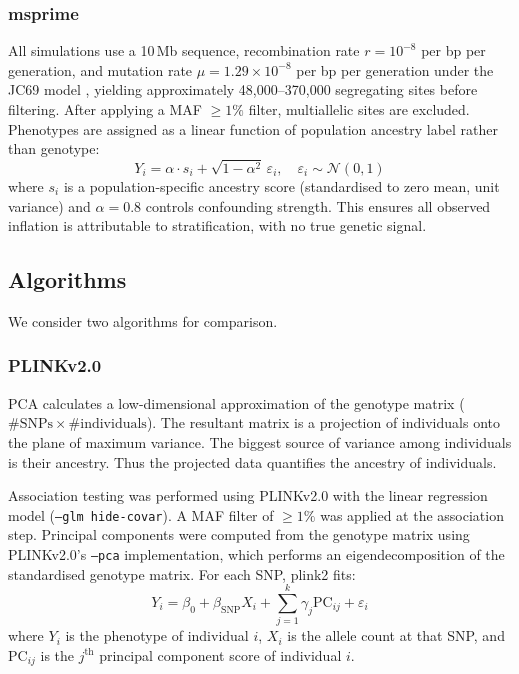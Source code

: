 \documentclass[unnumsec,webpdf,contemporary,large]{oup-authoring-template}
\theoremstyle{thmstyleone}
\theoremstyle{thmstyletwo}
\theoremstyle{thmstylethree}
\begin{document}
\subsubsection{msprime}
All simulations use a 10\,Mb sequence, recombination rate $r = 10^{-8}$ per bp per generation, and mutation rate $\mu = 1.29 \times 10^{-8}$ per bp per generation under the JC69 model \citep{msprime}, yielding approximately 48,000--370,000 segregating sites before filtering. After applying a MAF $\geq 1\%$ filter, multiallelic sites are excluded. Phenotypes are assigned as a linear function of population ancestry label rather than genotype:
\begin{equation}
    Y_i = \alpha \cdot s_i + \sqrt{1 - \alpha^2}\,\varepsilon_i, \quad \varepsilon_i \sim \mathcal{N}(0,1)
\end{equation}
where $s_i$ is a population-specific ancestry score (standardised to zero mean, unit variance) and $\alpha = 0.8$ controls confounding strength. This ensures all observed inflation is attributable to stratification, with no true genetic signal.

\subsection{Algorithms}
We consider two algorithms for comparison.

\subsubsection{PLINKv2.0}
PCA calculates a low-dimensional approximation of the genotype matrix ($\#\text{SNPs} \times \#\text{individuals}$). The resultant matrix is a projection of individuals onto the plane of maximum variance. The biggest source of variance among individuals is their ancestry. Thus the projected data quantifies the ancestry of individuals.

Association testing was performed using PLINKv2.0 \citep{plink2} with the linear regression model (\texttt{--glm hide-covar}). A MAF filter of $\geq 1\%$ was applied at the association step. Principal components were computed from the genotype matrix using PLINKv2.0's \texttt{--pca} implementation, which performs an eigendecomposition of the standardised genotype matrix. For each SNP, plink2 fits:
$$Y_i = \beta_0 + \beta_{\text{SNP}} X_i + \sum_{j=1}^{k} \gamma_j \text{PC}_{ij} + \varepsilon_i$$
where $Y_i$ is the phenotype of individual $i$, $X_i$ is the allele count at that SNP, and $\text{PC}_{ij}$ is the $j^{\text{th}}$ principal component score of individual $i$.
\end{document}
